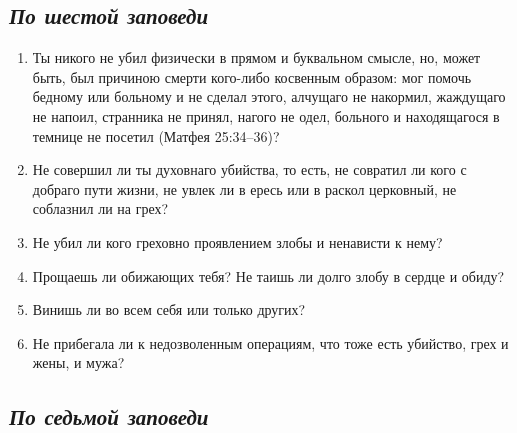 \subsection*{\itshape По шестой заповеди}

\begin{enumerate}

\item Ты никого не убил физически в прямом и буквальном смысле, но, может быть, был причиною смерти кого-либо косвенным образом: мог помочь бедному или больному и не сделал этого, алчущаго не накормил, жаждущаго не напоил, странника не принял, нагого не одел, больного и находящагося в темнице не посетил (Матфея 25:34--36)?

\item Не совершил ли ты духовнаго убийства, то есть, не совратил ли кого с добраго пути жизни, не увлек ли в ересь или в раскол церковный, не соблазнил ли на грех?

\item Не убил ли кого греховно проявлением злобы и ненависти к нему?

\item Прощаешь ли обижающих тебя? Не таишь ли долго злобу в сердце и обиду?

\item Винишь ли во всем себя или только других?

\item Не прибегала ли к недозволенным операциям, что тоже есть убийство, грех и жены, и мужа? 
\end{enumerate}

\subsection*{\itshape По седьмой заповеди}

